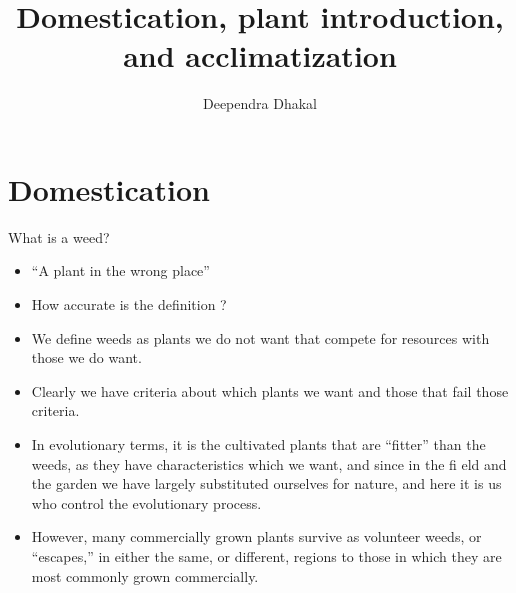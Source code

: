 \documentclass[11pt,ignorenonframetext,aspectratio=169]{beamer}
\title[]{Domestication, plant introduction, and acclimatization}
\author[
        Deependra Dhakal
    ]{Deependra Dhakal}
\institute[
    ]{
    Agriculture and Forestry University\\
\textit{ddhakal.rookie@gmail.com}\\
\url{https://rookie.rbind.io}
    }
\date[
      
  ]{
    }
\providecommand{\tightlist}{%
  \setlength{\itemsep}{0pt}\setlength{\parskip}{0pt}}
\begin{document}
  \begin{frame}[plain]
  \titlepage
  \end{frame}



\hypertarget{domestication}{%
\section{Domestication}\label{domestication}}

\begin{frame}{What is a weed?}
\protect\hypertarget{what-is-a-weed}{}
\begin{itemize}
\tightlist
\item
  ``A plant in the wrong place''
\item
  How accurate is the definition ?
\item
  We define weeds as plants we do not want that compete for resources
  with those we do want.
\item
  Clearly we have criteria about which plants we want and those that
  fail those criteria.
\item
  In evolutionary terms, it is the cultivated plants that are ``fitter''
  than the weeds, as they have characteristics which we want, and since
  in the fi eld and the garden we have largely substituted ourselves for
  nature, and here it is us who control the evolutionary process.
\item
  However, many commercially grown plants survive as volunteer weeds, or
  ``escapes,'' in either the same, or different, regions to those in
  which they are most commonly grown commercially.
\end{itemize}
\end{frame}
\end{document}
